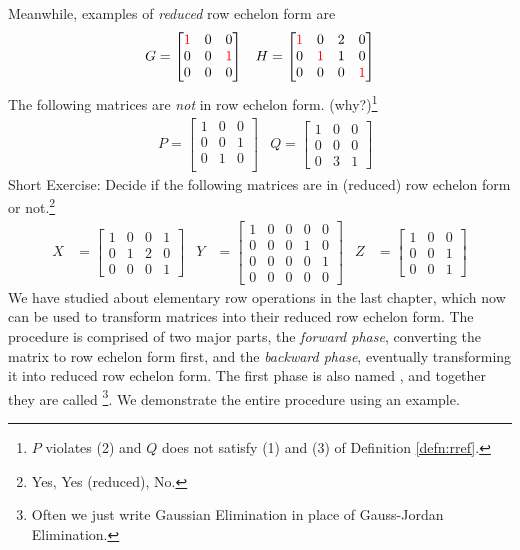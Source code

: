 Meanwhile, examples of \textit{reduced} row echelon form are
\begin{align*}
& G =
\begin{bmatrix}
\textcolor{red}{1} & 0 & 0 \\
0 & 0 & \textcolor{red}{1}\\
0 & 0 & 0 
\end{bmatrix}
& H =
\begin{bmatrix}
\textcolor{red}{1} & 0 & 2 & 0 \\
0 & \textcolor{red}{1} & 1 & 0 \\
0 & 0 & 0 & \textcolor{red}{1}
\end{bmatrix}
\end{align*}
The following matrices are \textit{not} in row echelon form. (why?)\footnote{$P$ violates (2) and $Q$ does not satisfy (1) and (3) of Definition \ref{defn:rref}.}
\begin{align*}
& P =
\begin{bmatrix}
1 & 0 & 0 \\
0 & 0 & 1 \\
0 & 1 & 0 \\
\end{bmatrix}
& Q =
\begin{bmatrix}
1 & 0 & 0 \\
0 & 0 & 0 \\
0 & 3 & 1
\end{bmatrix}
\end{align*}
Short Exercise: Decide if the following matrices are in (reduced) row echelon form or not.\footnote{Yes, Yes (reduced), No.}
\begin{align*}
X &= 
\begin{bmatrix}
1 & 0 & 0 & 1 \\
0 & 1 & 2 & 0 \\
0 & 0 & 0 & 1
\end{bmatrix}
& Y&=
\begin{bmatrix}
1 & 0 & 0 & 0 & 0 \\
0 & 0 & 0 & 1 & 0 \\
0 & 0 & 0 & 0 & 1 \\
0 & 0 & 0 & 0 & 0
\end{bmatrix}
& Z&=
\begin{bmatrix}
1 & 0 & 0 \\
0 & 0 & 1 \\
0 & 0 & 1 
\end{bmatrix}
\end{align*}
We have studied about elementary row operations in the last chapter, which now can be used to transform matrices into their reduced row echelon form. The procedure is comprised of two major parts, the \textit{forward phase}, converting the matrix to row echelon form first, and the \textit{backward phase}, eventually transforming it into reduced row echelon form. The first phase is also named , and together they are called \footnote{Often we just write Gaussian Elimination in place of Gauss-Jordan Elimination.}. We demonstrate the entire procedure using an example.
